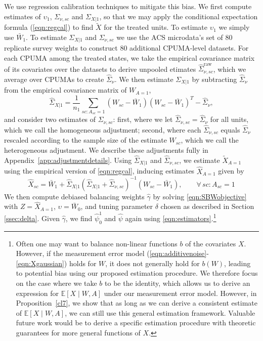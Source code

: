 \documentclass[aoas]{imsart}
\theoremstyle{plain}
\theoremstyle{remark}
\begin{document}
We use regression calibration techniques to mitigate this bias. We first compute estimates of $\upsilon_1$, $\Sigma_{\nu, sc}$ and $\Sigma_{X|1}$, so that we may apply the conditional expectation formula (\ref{eqn:regcal}) to find $\tilde{X}$ for the treated units. To estimate $\upsilon_1$ we simply use $\bar{W}_1$. To estimate $\Sigma_{X|1}$ and $\Sigma_{\nu,sc}$ we use the ACS microdata's set of 80 replicate survey weights to construct 80 additional CPUMA-level datasets. For each CPUMA among the treated states, we take the empirical covariance matrix of its covariates over the datasets to derive unpooled etimates $\hat{\Sigma}_{\nu,sc}^{\text{raw}}$, which we average over CPUMAs to create $\hat{\Sigma}_{\nu}$. We then estimate $\Sigma_{X|1}$ by subtracting $\hat{\Sigma}_{\nu}$ from the empirical covariance matrix of $W_{A=1}$,
\[ \hat{\Sigma}_{X|1} = \frac{1}{n_1} \sum_{sc:A_{sc}=1} (W_{sc} - \bar{W}_1)(W_{sc} - \bar{W}_1)^T - \hat{\Sigma}_{\nu},\]
and consider two estimates of $\Sigma_{\nu, sc}$: first, where we let $\hat{\Sigma}_{\nu,sc} = \hat{\Sigma}_{\nu}$ for all units, which we call the homogeneous adjustment; second, where each $\hat{\Sigma}_{\nu, sc}$ equals $\hat{\Sigma}_{\nu}$ rescaled according to the sample size of the estimate $W_{sc}$, which we call the heterogeneous adjustment. We describe these adjustments fully in Appendix~\ref{app:adjustmentdetails}. Using $\hat{\Sigma}_{X|1}$ and $\hat{\Sigma}_{\nu, sc}$, we estimate $\tilde{X}_{A=1}$ using the empirical version of \eqref{eqn:regcal}, inducing estimates $\hat{X}_{A=1}$ given by
\begin{equation}\label{eqn:hatX}
\hat{X}_{sc} = \bar{W}_1 + \hat{\Sigma}_{X|1} (\hat{\Sigma}_{X|1} + \hat{\Sigma}_{\nu,sc})^{-1}  (W_{sc} - \bar{W}_1), \qquad \forall\, sc: A_{sc}=1
\end{equation}
We then compute debiased balancing weights $\hat{\gamma}$ by solving \eqref{eqn:SBWobjective} with $Z = \hat{X}_{A=1}$, $\upsilon = \bar{W}_0$, and tuning parameter $\delta$ chosen as described in Section \ref{ssec:delta}. Given $\hat{\gamma}$, we find $\hat{\psi}_0^1$ and $\hat{\psi}$ again using \eqref{eqn:estimators}.\footnote{Often one may want to balance non-linear functions $b$ of the covariates $X$. However, if the measurement error model (\eqref{eqn:additivenoise}-\eqref{eqn:Xgaussian}) holds for $W$, it does not generally hold for $b(W)$, leading to potential bias using our proposed estimation procedure. We therefore focus on the case where we take $b$ to be the identity, which allows us to derive an expression for $\mathbb{E}[X \mid W, A]$ under our measurement error model. However, in Proposition~\ref{cl7}, we show that as long as we can derive a consistent estimate of $\mathbb{E}[X \mid W, A]$, we can still use this general estimation framework. Valuable future work would be to derive a specific estimation procedure with theoretic guarantees for more general functions of $X$.}
\end{document}
